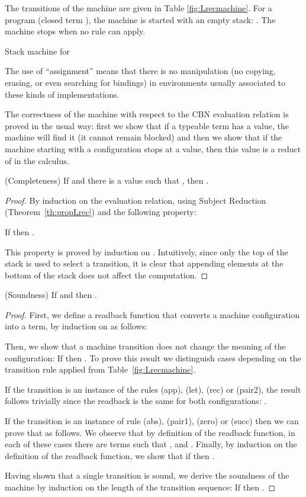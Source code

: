 \documentclass{article}
\begin{document}
The transitions of the machine are given in Table
\ref{fig:Lrecmachine}. 
For a program (closed term ), the machine is
started with an empty stack: .  The machine stops when no rule
can apply.
\begin{table*}

\caption{Stack machine for \LLCIrec}\label{fig:Lrecmachine}
\end{table*}

The use of ``assignment'' means that there is no manipulation (no
copying, erasing, or even searching for bindings) in environments
usually associated to these kinds of implementations.

The correctness of the machine with respect to the CBN evaluation
relation is proved in the usual way: first we show that if a typeable
term has a value, the machine will find it (it cannot remain blocked)
and then we show that if the machine starting with a configuration 
 stops at a
value, then this value is a reduct of  in the calculus.


\begin{theorem} (Completeness)
If  and there is a value  such that 
, then .
\end{theorem}

\begin{proof}
  By induction on the evaluation relation, using Subject Reduction
  (Theorem~\ref{th:propLrec}) and the following property:

If   then .

This property is proved by induction on . Intuitively,
since only the top of the stack is used to select a transition, it is
clear that appending elements at the bottom of the stack does not
affect the computation.
\end{proof}


\begin{theorem}(Soundness)
If  and   then .
\end{theorem}
\begin{proof}
First, we define a readback function 
that converts a machine configuration 
into a term, by induction on  as follows:

Then, we show that 
a machine transition does not change the meaning of
the configuration:
If  then 
.
To prove this result we distinguish cases depending on the transition rule applied from Table~\ref{fig:Lrecmachine}.




If the transition  is an instance of the rules (app), (let), (rec) or (pair2), the result follows trivially since the readback is the same for both configurations: .  

If  the transition  is an instance of rule (abs), (pair1), (zero) or (succ) then  we can prove that  as follows. We observe that by definition of the readback function, in each of these cases there are terms   such that ,   and . Finally, by induction on the definition of the readback function, we show that if  then .

Having shown that a single transition  is sound, we derive the soundness of the machine by induction on the length of the transition sequence: If  then 
.
\end{proof}
\end{document}
